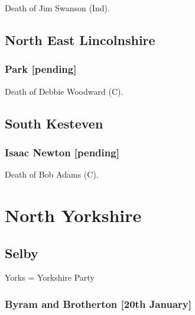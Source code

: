 \documentclass[a4paper,openany]{book}
\begin{document}
\begin{resultsiii}
Death of Jim Swanson (Ind).

\subsection*{North East Lincolnshire}

\subsubsection*{Park \hspace*{\fill}\nolinebreak[1]%
	\enspace\hspace*{\fill}
	[pending]}


Death of Debbie Woodward (C).

\subsection*{South Kesteven}

\subsubsection*{Isaac Newton \hspace*{\fill}\nolinebreak[1]%
	\enspace\hspace*{\fill}
	[pending]}


Death of Bob Adams (C).

\section{North Yorkshire}

\subsection*{Selby}

Yorks = Yorkshire Party

\subsubsection*{Byram and Brotherton \hspace*{\fill}\nolinebreak[1]%
	\enspace\hspace*{\fill}
	[20th January]}


\end{resultsiii}
\end{document}
